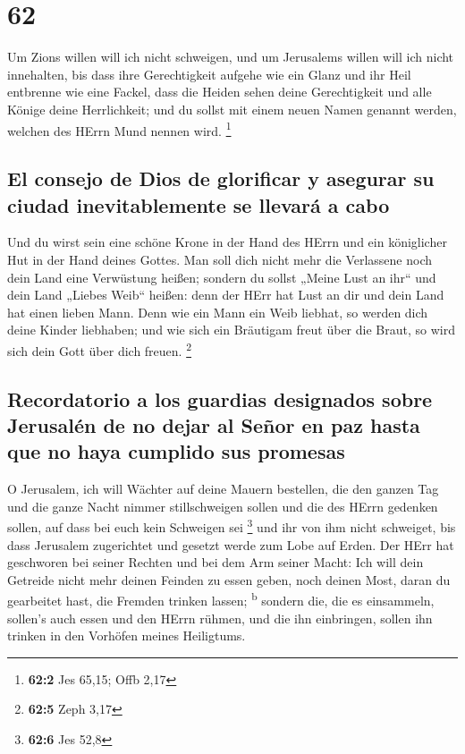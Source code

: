 \hypertarget{section-61}{%
\section{62}\label{section-61}}

 Um Zions willen will ich nicht schweigen, und um
Jerusalems willen will ich nicht innehalten, bis dass ihre Gerechtigkeit
aufgehe wie ein Glanz und ihr Heil entbrenne wie eine Fackel,
 dass die Heiden sehen deine Gerechtigkeit und alle Könige
deine Herrlichkeit; und du sollst mit einem neuen Namen genannt werden,
welchen des HErrn Mund nennen wird. \footnote{\textbf{62:2} Jes 65,15;
  Offb 2,17}

\hypertarget{el-consejo-de-dios-de-glorificar-y-asegurar-su-ciudad-inevitablemente-se-llevaruxe1-a-cabo}{%
\subsection{El consejo de Dios de glorificar y asegurar su ciudad
inevitablemente se llevará a
cabo}\label{el-consejo-de-dios-de-glorificar-y-asegurar-su-ciudad-inevitablemente-se-llevaruxe1-a-cabo}}

 Und du wirst sein eine schöne Krone in der Hand des HErrn
und ein königlicher Hut in der Hand deines Gottes.  Man
soll dich nicht mehr die Verlassene noch dein Land eine Verwüstung
heißen; sondern du sollst „Meine Lust an ihr`` und dein Land „Liebes
Weib`` heißen: denn der HErr hat Lust an dir und dein Land hat einen
lieben Mann.  Denn wie ein Mann ein Weib liebhat, so
werden dich deine Kinder liebhaben; und wie sich ein Bräutigam freut
über die Braut, so wird sich dein Gott über dich freuen. \footnote{\textbf{62:5}
  Zeph 3,17}

\hypertarget{recordatorio-a-los-guardias-designados-sobre-jerusaluxe9n-de-no-dejar-al-seuxf1or-en-paz-hasta-que-no-haya-cumplido-sus-promesas}{%
\subsection{Recordatorio a los guardias designados sobre Jerusalén de no
dejar al Señor en paz hasta que no haya cumplido sus
promesas}\label{recordatorio-a-los-guardias-designados-sobre-jerusaluxe9n-de-no-dejar-al-seuxf1or-en-paz-hasta-que-no-haya-cumplido-sus-promesas}}

 O Jerusalem, ich will Wächter auf deine Mauern bestellen,
die den ganzen Tag und die ganze Nacht nimmer stillschweigen sollen und
die des HErrn gedenken sollen, auf dass bei euch kein Schweigen sei
\footnote{\textbf{62:6} Jes 52,8}  und ihr von ihm nicht
schweiget, bis dass Jerusalem zugerichtet und gesetzt werde zum Lobe auf
Erden.  Der HErr hat geschworen bei seiner Rechten und bei
dem Arm seiner Macht: Ich will dein Getreide nicht mehr deinen Feinden
zu essen geben, noch deinen Most, daran du gearbeitet hast, die Fremden
trinken lassen; \textsuperscript{b}  sondern die, die es
einsammeln, sollen's auch essen und den HErrn rühmen, und die ihn
einbringen, sollen ihn trinken in den Vorhöfen meines Heiligtums.

